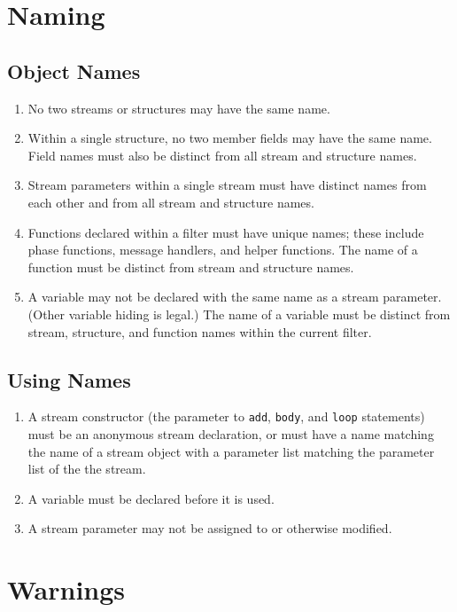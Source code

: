 \documentclass[11pt]{article}
\begin{document}
\section{Naming}

\subsection{Object Names}

\begin{enumerate}
\item No two streams or structures may have the same name.
\item Within a single structure, no two member fields may have the
  same name.  Field names must also be distinct from all stream and
  structure names.
\item Stream parameters within a single stream must have distinct
  names from each other and from all stream and structure names.
\item Functions declared within a filter must have unique names; these
  include phase functions, message handlers, and helper functions.
  The name of a function must be distinct from stream and structure
  names.
\item A variable may not be declared with the same name as a stream
  parameter.  (Other variable hiding is legal.)  The name of a
  variable must be distinct from stream, structure, and function
  names within the current filter.
\end{enumerate}

\subsection{Using Names}

\begin{enumerate}
\item A stream constructor (the parameter to \lstinline|add|,
  \lstinline|body|, and \lstinline|loop| statements) must be an
  anonymous stream declaration, or must have a name matching the name
  of a stream object with a parameter list matching the parameter list
  of  the the stream.
\item A variable must be declared before it is used.
\item A stream parameter may not be assigned to or otherwise modified.
\end{enumerate}

\section{Warnings}
\end{document}
